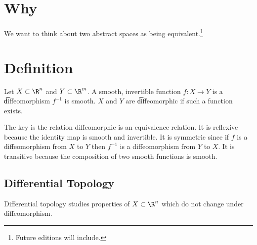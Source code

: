 
\section*{Why}

We want to think about two abstract spaces as being equivalent.\footnote{Future editions will include.}

\section*{Definition}

Let $X \subset \R ^n$ and $Y \subset \R ^m$.
A smooth, invertible function $f: X \to Y$ is a \t{diffeomorphism} $f^{-1}$ is smooth.
$X$ and $Y$ are \t{diffeomorphic} if such a function exists.

The key is the relation diffeomorphic is an equivalence relation.
It is reflexive because the identity map is smooth and invertible.
It is symmetric since if $f$ is a diffeomorphism from $X$ to $Y$ then $f^{-1}$ is a diffeomorphism from $Y$ to $X$.
It is transitive because the composition of two smooth functions is smooth.

\subsection*{Differential Topology}

Differential topology studies properties of $X \subset \R ^n$ which do not change under diffeomorphism.

\blankpage